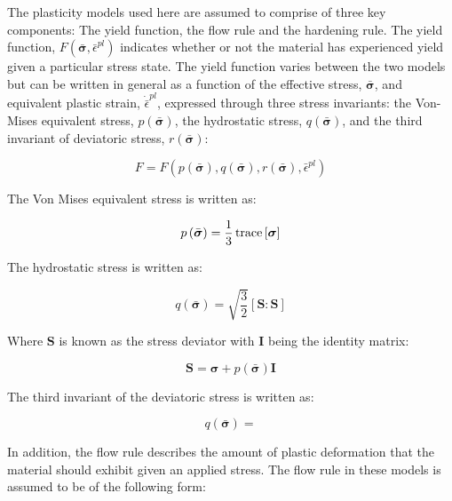 The plasticity models used here are assumed to comprise of three key components: The yield function, the flow rule and the hardening rule. The yield function, $F\left(\bar{\boldsymbol{\sigma}},\bar{\epsilon}^{pl}\right)$ indicates whether or not the material has experienced yield given a particular stress state. The yield function varies between the two models but can be written in general as a function of the effective stress, $\bar{\boldsymbol{\sigma}}$, and equivalent plastic strain, $\dot{\bar{\epsilon}}^{pl}$, expressed through three stress invariants: the Von-Mises equivalent stress, $p\left(\bar{\boldsymbol{\sigma}}\right)$, the hydrostatic stress, $q\left(\bar{\boldsymbol{\sigma}}\right)$, and the third invariant of deviatoric stress, $r\left(\bar{\boldsymbol{\sigma}}\right)$:

\begin{equation}
    F = 
    F
    \left(
        p\left(\bar{\boldsymbol{\sigma}}\right), q\left(\bar{\boldsymbol{\sigma}}\right), r\left(\bar{\boldsymbol{\sigma}}\right),\bar{\epsilon}^{pl}
    \right)
\label{eqn:gen1}
\end{equation}

The Von Mises equivalent stress is written as:

\begin{equation}
p\left(\bar{\boldsymbol{\sigma}}\right) = \frac{1}{3}\operatorname{trace}\left[\boldsymbol{\sigma}\right]
\label{eqn:gen2}
\end{equation}

The hydrostatic stress is written as:

\begin{equation}
q\left(\bar{\boldsymbol{\sigma}}\right)=\sqrt{\frac{3}{2}}\left[\mathbf{S}:\mathbf{S}\right]
\label{eqn:gen3}
\end{equation}

Where $\mathbf{S}$ is known as the stress deviator with $\mathbf{I}$ being the identity matrix:

\begin{equation}
\mathbf{S}=\boldsymbol{\sigma}+p\left(\bar{\boldsymbol{\sigma}}\right)\mathbf{I}
\label{eqn:gen4}
\end{equation}

The third invariant of the deviatoric stress is written as:

\begin{equation}
q\left(\bar{\boldsymbol{\sigma}}\right)=
\label{eqn:gen5}
\end{equation}

In addition, the flow rule describes the amount of plastic deformation that the material should exhibit given an applied stress. The flow rule in these models is assumed to be of the following form:

